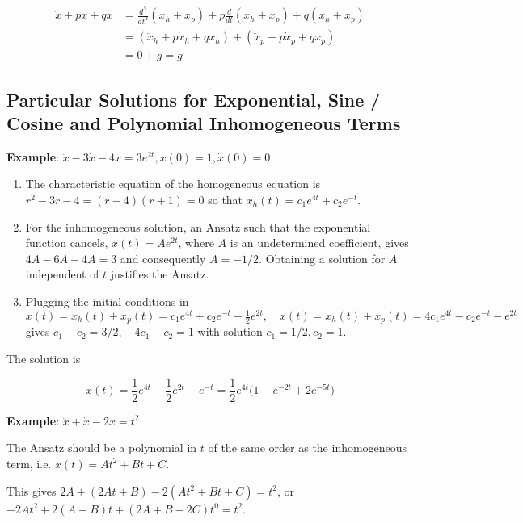 \begin{align*}
    \ddot{x} + p \dot{x} + q x & = \frac{d^2}{dt^2}(x_h + x_p) + p \frac{d}{dt}(x_h + x_p) + q (x_h + x_p) \\
    & = (\ddot{x}_h + p \dot{x}_h + q x_h) + (\ddot{x}_p + p \dot{x}_p + q x_p) \\
    & = 0 + g = g
\end{align*}

\subsection{Particular Solutions for Exponential, Sine / Cosine and Polynomial Inhomogeneous Terms}

\begin{paracol}{2}

\textbf{Example}: $\ddot{x} - 3 \dot{x} - 4 x = 3 e^{2t}, x(0) = 1, \dot{x}(0) = 0$

\begin{enumerate}
    \item The characteristic equation of the homogeneous equation is $r^2 - 3r - 4 = (r-4) (r+1) = 0$ so that $x_h(t) = c_1 e^{4t} + c_2 e^{-t}$.
    
    \item For the inhomogeneous solution, an Ansatz such that the exponential function cancels, $x(t) = A e^{2t}$, where $A$ is an undetermined coefficient, gives $4A - 6A - 4A = 3$ and consequently $A = -1/2$. Obtaining a solution for $A$ independent of $t$ justifies the Ansatz.
    
    \item Plugging the initial conditions in $x(t) = x_h(t) + x_p(t) = c_1 e^{4t}+ c_2 e^{-t} - \frac{1}{2} e^{2t}, \quad \dot{x}(t) = \dot{x}_h(t) + \dot{x}_p(t) = 4 c_1 e^{4t} - c_2 e^{-t} - e^{2t}$ gives $c_1 + c_2 = 3/2, \quad 4 c_1 - c_2 = 1$ with solution $c_1 = 1/2, c_2 = 1$.
\end{enumerate}

The solution is

$$x(t) = \frac{1}{2} e^{4t} - \frac{1}{2} e^{2t} - e^{-t} = \frac{1}{2} e^{4t} \big( 1 - e^{-2t} + 2 e^{-5t} \big)$$

\textbf{Example}: $\ddot{x} + \dot{x} - 2x = t^2$

The Ansatz should be a polynomial in $t$ of the same order as the inhomogeneous term, i.e. $x(t) = At^2 + Bt + C$.

This gives $2A + (2At + B) - 2(At^2 + Bt + C) = t^2$, or $-2At^2 + 2(A - B)t + (2A + B - 2C)t^0 = t^2$.


\end{paracol}
